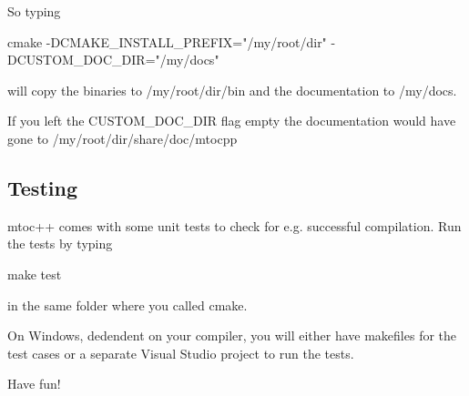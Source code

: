 So typing 
\begin{DoxyCode}
cmake -DCMAKE\_INSTALL\_PREFIX=\textcolor{stringliteral}{"/my/root/dir"} -DCUSTOM\_DOC\_DIR=\textcolor{stringliteral}{"/my/docs"} 
\end{DoxyCode}
 will copy the binaries to {\ttfamily /my/root/dir/bin} and the documentation to {\ttfamily /my/docs}.

If you left the {\ttfamily C\+U\+S\+T\+O\+M\+\_\+\+D\+O\+C\+\_\+\+D\+I\+R} flag empty the documentation would have gone to {\ttfamily /my/root/dir/share/doc/mtocpp} \hypertarget{install_inst_test}{}\subsection{Testing}\label{install_inst_test}
mtoc++ comes with some unit tests to check for e.\+g. successful compilation. Run the tests by typing 
\begin{DoxyCode}
make test 
\end{DoxyCode}
 in the same folder where you called {\ttfamily cmake}.

On Windows, dedendent on your compiler, you will either have makefiles for the test cases or a separate Visual Studio project to run the tests.

Have fun! 